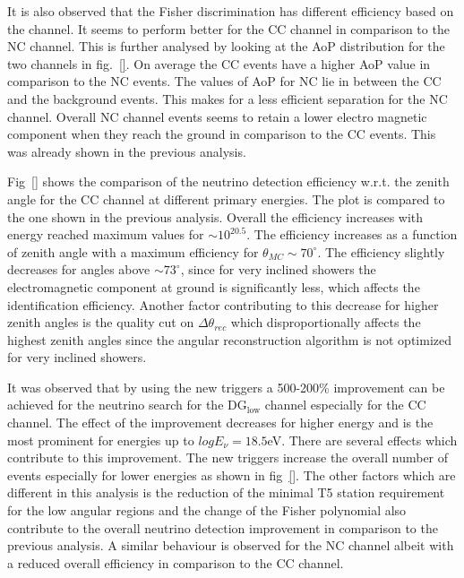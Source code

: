 It is also observed that the Fisher discrimination has different efficiency based on the channel. It seems to perform better for the CC channel in comparison to the NC channel. This is further analysed by looking at the AoP distribution for the two channels in fig.~\ref{}. On average the CC events have a higher AoP value in comparison to the NC events. The values of AoP for NC lie in between the CC and the background events. This makes for a less efficient separation for the NC channel. Overall NC channel events seems to retain a lower electro magnetic component when they reach the ground in comparison to the CC events. This was already shown in the previous analysis.

Fig~\ref{} shows the comparison of the neutrino detection efficiency w.r.t. the zenith angle for the CC channel at different primary energies. The plot is compared to the one shown in the previous analysis. Overall the efficiency increases with energy reached maximum values for $\sim 10^{20.5}$. The efficiency increases as a function of zenith angle with a maximum efficiency for $\theta_{MC} \sim 70^{\circ}$. The efficiency slightly decreases for angles above $ \sim 73^{\circ}$, since for very inclined showers the electromagnetic component at ground is significantly less, which affects the identification efficiency. Another factor contributing to this decrease for higher zenith angles is the quality cut on $\Delta \theta_{rec}$ which disproportionally affects the highest zenith angles since the angular reconstruction algorithm is not optimized for very inclined showers. 

It was observed that by using the new triggers a 500-200\% improvement can be achieved for the neutrino search for the DG$\mathrm{_{low}}$ channel especially for the CC channel. The effect of the improvement decreases for higher energy and is the most prominent for energies up to $log E_{\nu} = 18.5$eV. There are several effects which contribute to this improvement. The new triggers increase the overall number of events especially for lower energies as shown in fig~\ref{}. The other factors which are different in this analysis is the reduction of the minimal T5 station requirement for the low angular regions and the change of the Fisher polynomial also contribute to the overall neutrino detection improvement in comparison to the previous analysis. A similar behaviour is observed for the NC channel albeit with a reduced overall efficiency in comparison to the CC channel. 





